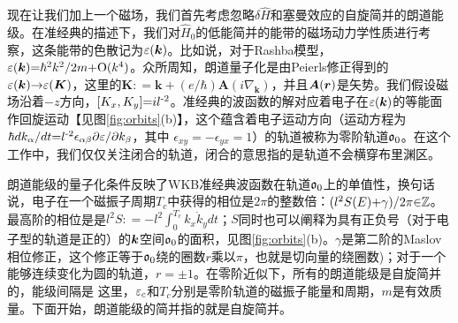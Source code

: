 现在让我们加上一个磁场，我们首先考虑忽略$\delta \hat{H}$和塞曼效应的自旋简并的朗道能级。在准经典的描述下，我们对$\hat{H}_0$的低能简并的能带的磁场动力学性质进行考察，这条能带的色散记为$\varepsilon(\boldsymbol{k})$。比如说，对于Rashba模型，$\varepsilon(\boldsymbol{k}){=}\hbar^2 k^2/2m{+}\text{O}(k^4)$。众所周知，朗道量子化是由Peierls修正得到的$\varepsilon(\boldsymbol{k}){\rightarrow}\varepsilon(\boldsymbol{K})$\cite{peierls_substitution}，这里的$\boldsymbol{K}{:}{=}\boldsymbol{k}{+}(e/\hbar) \boldsymbol{A}(i\nabla_{\boldsymbol{k}})$，并且$\boldsymbol{A}(\boldsymbol{r})$是矢势。我们假设磁场沿着$-z$方向，$[K_x,K_y]{=}il^{\text{-}2}$。准经典的波函数的解对应着电子在$\varepsilon(\boldsymbol{k})$的等能面作回旋运动【见图\ref{fig:orbits}(b)】，这个蕴含着电子运动方向（运动方程为$ \hbar dk_{\alpha}/dt {=} l^{\text{-}2} \epsilon_{\alpha\beta}\partial \varepsilon/\partial k_{\beta} $，其中 $\epsilon_{xy}{=}{-}\epsilon_{yx}{=}1$）的轨道被称为零阶轨道$\mathfrak{o}_0$。在这个工作中，我们仅仅关注闭合的轨道，闭合的意思指的是轨道不会横穿布里渊区。

朗道能级的量子化条件反映了WKB准经典波函数在轨道$\mathfrak{o}_0$上的单值性\cite{berry_mount_review}，换句话说，电子在一个磁振子周期$T_c$中获得的相位是$2\pi$的整数倍：$(l^2S(E){+}\gamma)/2\pi{\in}\mathbb{Z}$。最高阶的相位是是$l^2S{:}{=}{-}l^2\int_{0}^{T_c} k_x \dot{k}_y dt$；$S$同时也可以阐释为具有正负号（对于电子型的轨道是正的）的$\boldsymbol{k}$空间$\mathfrak{o}_0$的面积，见图\ref{fig:orbits}(b)。$\gamma$是第二阶的Maslov相位修正\cite{keller1958}，这个修正等于$\mathfrak{o}_0$绕的圈数$r$乘以$\pi$，也就是切向量的绕圈数)\cite{100p}；对于一个能够连续变化为圆的轨道，$r{=}{\pm} 1$。在零阶近似下，所有的朗道能级是自旋简并的，能级间隔是
这里，$\varepsilon_c$和$T_c$分别是零阶轨道的磁振子能量和周期，$m$是有效质量。下面开始，朗道能级的简并指的就是自旋简并。



